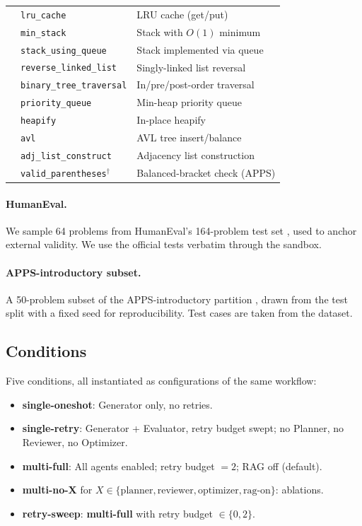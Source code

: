 \documentclass[journal]{IEEEtran}
\begin{document}
\begin{table}[!t]
\begin{tabular}{@{}lll@{}}
  & \texttt{lru\_cache}       & LRU cache (get/put) \\
  & \texttt{min\_stack}       & Stack with $O(1)$ minimum \\
  & \texttt{stack\_using\_queue} & Stack implemented via queue \\
  & \texttt{reverse\_linked\_list} & Singly-linked list reversal \\
  & \texttt{binary\_tree\_traversal} & In/pre/post-order traversal \\
  & \texttt{priority\_queue}  & Min-heap priority queue \\
  & \texttt{heapify}          & In-place heapify \\
  & \texttt{avl}              & AVL tree insert/balance \\
  & \texttt{adj\_list\_construct} & Adjacency list construction \\
  & \texttt{valid\_parentheses}$^\dagger$ & Balanced-bracket check (APPS) \\
\bottomrule
\end{tabular}
\end{table}

\paragraph{HumanEval.}
We sample 64 problems from HumanEval's 164-problem test set \cite{chen2021codex}, used to anchor external validity. We use the official tests verbatim through the sandbox.

\paragraph{APPS-introductory subset.}
A 50-problem subset of the APPS-introductory partition \cite{hendrycks2021apps}, drawn from the test split with a fixed seed for reproducibility. Test cases are taken from the dataset.

\subsection{Conditions}\label{sec:conditions}
Five conditions, all instantiated as configurations of the same workflow:

\begin{itemize}
  \item \textbf{single-oneshot}: Generator only, no retries.
  \item \textbf{single-retry}: Generator + Evaluator, retry budget swept; no Planner, no Reviewer, no Optimizer.
  \item \textbf{multi-full}: All agents enabled; retry budget $=2$; RAG off (default).
  \item \textbf{multi-no-X} for $X \in \{\text{planner}, \text{reviewer}, \text{optimizer}, \text{rag-on}\}$: ablations.
  \item \textbf{retry-sweep}: \textbf{multi-full} with retry budget $\in \{0, 2\}$.
\end{itemize}
\end{document}
